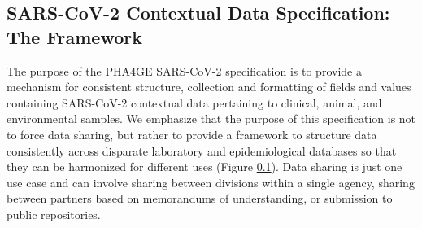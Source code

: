 \subsection{SARS-CoV-2 Contextual Data Specification: The Framework}

The purpose of the PHA4GE SARS-CoV-2 specification is to provide a mechanism for consistent structure, collection and formatting of fields and values containing SARS-CoV-2 contextual data pertaining to clinical, animal, and environmental samples. We emphasize that the purpose of this specification is not to force data sharing, but rather to provide a framework to structure data consistently across disparate laboratory and epidemiological databases so that they can be harmonized for different uses (Figure \ref{}). Data sharing is just one use case and can involve sharing between divisions within a single agency, sharing between partners based on memorandums of understanding, or submission to public repositories. 

